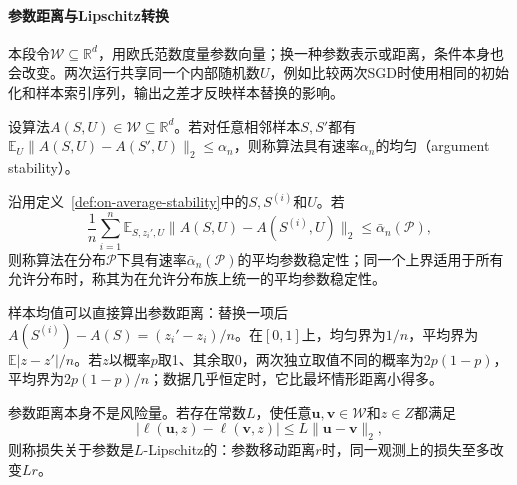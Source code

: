 \paragraph{参数距离与Lipschitz转换}

本段令$\mathcal W\subseteq\mathbb R^d$，用欧氏范数度量参数向量；换一种参数表示或距离，条件本身也会改变。两次运行共享同一个内部随机数$U$，例如比较两次SGD时使用相同的初始化和样本索引序列，输出之差才反映样本替换的影响。

\begin{definition}[均匀参数稳定性]
\label{def:uniform-parameter-stability}
设算法$A(S,U)\in\mathcal W\subseteq\mathbb R^d$。若对任意相邻样本$S,S'$都有$\mathbb E_U\|A(S,U)-A(S',U)\|_2\leq\alpha_n$，则称算法具有速率$\alpha_n$的均匀（argument stability）。
\end{definition}

\begin{definition}[平均参数稳定性]
\label{def:average-parameter-stability}
沿用定义~\ref{def:on-average-stability}中的$S,S^{(i)}$和$U$。若
\begin{equation}
 \frac1n\sum_{i=1}^n\mathbb E_{S,z_i',U}\|A(S,U)-A(S^{(i)},U)\|_2\leq\bar\alpha_n(\mathcal P),
 \label{eq:average-parameter-stability}
\end{equation}
则称算法在分布$\mathcal P$下具有速率$\bar\alpha_n(\mathcal P)$的平均参数稳定性；同一个上界适用于所有允许分布时，称其为在允许分布族上统一的平均参数稳定性。
\end{definition}

样本均值可以直接算出参数距离：替换一项后$A(S^{(i)})-A(S)=(z_i'-z_i)/n$。在$[0,1]$上，均匀界为$1/n$，平均界为$\mathbb E|z-z'|/n$。若$z$以概率$p$取1、其余取0，两次独立取值不同的概率为$2p(1-p)$，平均界为$2p(1-p)/n$；数据几乎恒定时，它比最坏情形距离小得多。

参数距离本身不是风险量。若存在常数$L$，使任意$\bm u,\bm v\in\mathcal W$和$z\in Z$都满足
\begin{equation}
 |\ell(\bm u,z)-\ell(\bm v,z)|\leq L\|\bm u-\bm v\|_2,
 \label{eq:parameter-loss-lipschitz}
\end{equation}
则称损失关于参数是$L$-Lipschitz的：参数移动距离$r$时，同一观测上的损失至多改变$Lr$。

